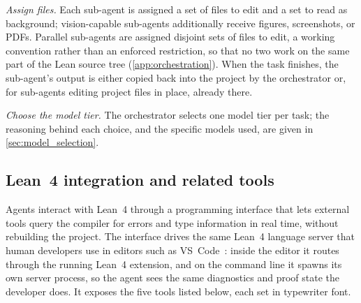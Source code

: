 \emph{Assign files.} Each sub-agent is assigned a set of files to edit and a set to read as background; vision-capable sub-agents additionally receive figures, screenshots, or PDFs. Parallel sub-agents are assigned disjoint sets of files to edit, a working convention rather than an enforced restriction, so that no two work on the same part of the Lean source tree (\cref{app:orchestration}). When the task finishes, the sub-agent's output is either copied back into the project by the orchestrator or, for sub-agents editing project files in place, already there.


\emph{Choose the model tier.} The orchestrator selects one model tier per task; the reasoning behind each choice, and the specific models used, are given in \cref{sec:model_selection}.

\subsection{Lean~4 integration and related tools}\label{sec:lean_tools}

Agents interact with Lean~4 through a programming interface that lets external tools query the compiler for errors and type information in real time, without rebuilding the project. The interface drives the same Lean~4 language server that human developers use in editors such as VS~Code~\cite{MicrosoftCorporation2024Visual}: inside the editor it routes through the running Lean~4 extension, and on the command line it spawns its own server process, so the agent sees the same diagnostics and proof state the developer does. It exposes the five tools listed below, each set in typewriter font.

